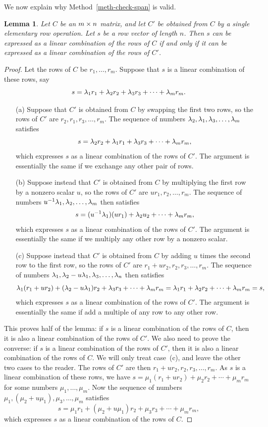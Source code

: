 \documentclass[reqno]{amsart}
\newtheorem{lemma}[theorem]{Lemma}
\theoremstyle{definition}
\begin{document}
We now explain why Method~\ref{meth-check-span} is valid.
\begin{lemma}\label{lem-span-invariant}
 Let $C$ be an $m\times n$ matrix, and let $C'$ be obtained from $C$ by a
 single elementary row operation.  Let $s$ be a row vector of length
 $n$.  Then $s$ can be expressed as a linear combination of the rows
 of $C$ if and only if it can be expressed as a linear combination of
 the rows of $C'$.
\end{lemma}
\begin{proof}
 Let the rows of $C$ be $r_1,\dotsc,r_m$.  Suppose that $s$ is a
 linear combination of these rows, say
 \[ s=\lambda_1r_1+\lambda_2r_2+\lambda_3r_3+\dotsb+\lambda_mr_m. \]
 \begin{itemize}
  \item[(a)] Suppose that $C'$ is obtained from $C$ by swapping the
   first two rows, so the rows of $C'$ are $r_2,r_1,r_3,\dotsc,r_m$.
   The sequence of numbers $\lambda_2,\lambda_1,\lambda_3,\dotsc,\lambda_m$ satisfies
   \[ s=\lambda_2r_2+\lambda_1r_1+\lambda_3r_3+\dotsb+\lambda_mr_m, \]
   which expresses $s$ as a linear combination of the rows of $C'$.  The
   argument is essentially the same if we exchange any other pair of
   rows.
  \item[(b)] Suppose instead that $C'$ is obtained from $C$ by
   multiplying the first row by a nonzero scalar $u$, so the rows of
   $C'$ are $ur_1,r_2,\dotsc,r_m$.  The sequence of numbers
   $u^{-1}\lambda_1,\lambda_2,\dotsc,\lambda_m$ then satisfies
   \[ s = (u^{-1}\lambda_1)(ur_1)+\lambda_2u_2+\dotsb+\lambda_mr_m, \]
   which expresses $s$ as a linear combination of the rows of $C'$.  The
   argument is essentially the same if we multiply any other row by a
   nonzero scalar.
  \item[(c)] Suppose instead that $C'$ is obtained from $C$ by adding
   $u$ times the second row to the first row, so the rows of $C'$ are
   $r_1+ur_2,r_2,r_3,\dotsc,r_m$.  The sequence of numbers
   $\lambda_1,\lambda_2-u\lambda_1,\lambda_3,\dotsc,\lambda_n$ then satisfies
   \[ \lambda_1(r_1+ur_2)+(\lambda_2-u\lambda_1)r_2+\lambda_3r_3+\dotsb+\lambda_mr_m =
       \lambda_1r_1+\lambda_2r_2+\dotsb+\lambda_mr_m=s,
   \]
   which expresses $s$ as a linear combination of the rows of $C'$.  The
   argument is essentially the same if add a multiple of any row to
   any other row.
 \end{itemize}
 This proves half of the lemma: if $s$ is a linear combination of the
 rows of $C$, then it is also a linear combination of the rows of
 $C'$.  We also need to prove the converse: if $s$ is a linear
 combination of the rows of $C'$, then it is also a linear combination
 of the rows of $C$.  We will only treat case~(c), and leave the other
 two cases to the reader.  The rows of $C'$ are then
 $r_1+ur_2,r_2,r_3,\dotsc,r_m$.  As $s$ is a linear combination of
 these rows, we have $s=\mu_1(r_1+ur_2)+\mu_2r_2+\dotsb+\mu_mr_m$ for
 some numbers $\mu_1,\dotsc,\mu_m$.  Now the sequence of numbers
 $\mu_1,(\mu_2+u\mu_1),\mu_3,\dotsc,\mu_m$ satisfies
 \[ s = \mu_1r_1+(\mu_2+u\mu_1)r_2+\mu_3r_3+\dotsb+\mu_mr_m, \]
 which expresses $s$ as a linear combination of the rows of $C$.
\end{proof}
\end{document}
